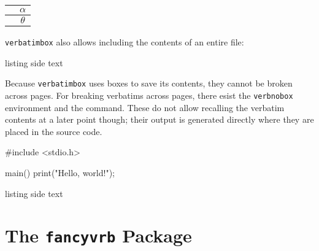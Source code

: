 \documentclass[article,a4paper,oneside,10pt]{memoir}
\newcommand\code[1]{\texttt{#1}}
\begin{document}
\vfill

\begin{tcblisting}{}
    \begin{myverbbox}{\vtheta}\theta\end{myverbbox}
    \begin{myverbbox}{\valpha}\alpha\end{myverbbox}
    \begin{tabular}{|c|c|} \hline
    \valpha & $\alpha$ \\ \hline
    \vtheta & $\theta$ \\ \hline
    \end{tabular}
\end{tcblisting}

\newpage
\code{verbatimbox} also allows including the contents of an entire file:

\begin{tcblisting}{listing side text}
    \theverbbox
\end{tcblisting}

Because  \code{verbatimbox}  uses boxes  to  save  its contents,  they  cannot
be  broken across  pages. For  breaking verbatims  across  pages, there  esist
the  \code{verbnobox}  environment and  the  \texttt{\verbfilenobox}
command. These do not  allow recalling the verbatim contents at  a later point
though; their output is generated directly where they are placed in the source
code.


\begin{tcblisting}{}
    \begin{verbnobox}
    #include <stdio.h>

    main() {
        print("Hello, world!\n");
    }
    \end{verbnobox}
\end{tcblisting}

\begin{tcblisting}{listing side text}
\end{tcblisting}

% ========================================================================== %
\newpage
\chapter{The \code{fancyvrb} Package \cite{fancyvrb}}
\label{chap:fancyvrb}
\end{document}
